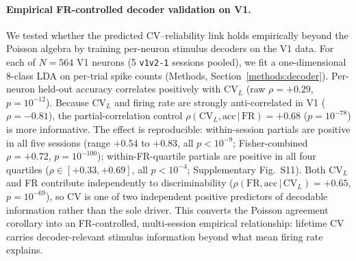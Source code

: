 \paragraph{Empirical FR-controlled decoder validation on V1.}
We tested whether the predicted CV--reliability link holds empirically beyond the Poisson algebra by training per-neuron stimulus decoders on the V1 data.  For each of $N=564$ V1 neurons (5 \texttt{v1v2-1} sessions pooled), we fit a one-dimensional 8-class LDA on per-trial spike counts (Methods, Section~\ref{methods:decoder}).  Per-neuron held-out accuracy correlates positively with $\mathrm{CV}_L$ (raw $\rho=+0.29$, $p=10^{-12}$).  Because $\mathrm{CV}_L$ and firing rate are strongly anti-correlated in V1 ($\rho=-0.81$), the partial-correlation control $\rho(\mathrm{CV}_L,\mathrm{acc}\,|\,\mathrm{FR}) = +0.68$ ($p=10^{-78}$) is more informative.  The effect is reproducible: within-session partials are positive in all five sessions (range $+0.54$ to $+0.83$, all $p<10^{-9}$; Fisher-combined $\rho=+0.72$, $p=10^{-100}$); within-FR-quartile partials are positive in all four quartiles ($\rho\in[+0.33,+0.69]$, all $p<10^{-4}$; Supplementary Fig.~S11).  Both $\mathrm{CV}_L$ and FR contribute independently to discriminability ($\rho(\mathrm{FR},\mathrm{acc}\,|\,\mathrm{CV}_L)=+0.65$, $p=10^{-69}$), so CV is one of two independent positive predictors of decodable information rather than the sole driver.  This converts the Poisson agreement corollary into an FR-controlled, multi-session empirical relationship: lifetime CV carries decoder-relevant stimulus information beyond what mean firing rate explains.


